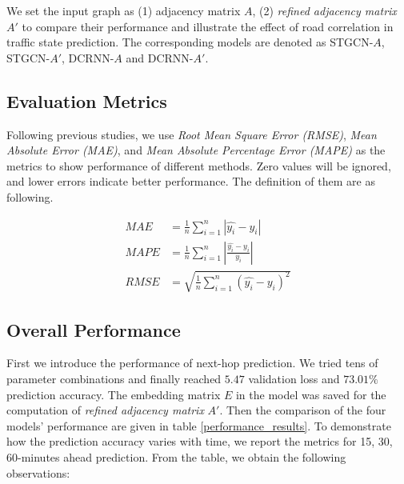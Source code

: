 We set the input graph as (1) adjacency matrix $A$, (2) \textit{refined adjacency matrix} $A'$ to compare their performance and illustrate the effect of road correlation in traffic state prediction. The corresponding models are denoted as STGCN-$A$, STGCN-$A'$, DCRNN-$A$ and DCRNN-$A'$.

\subsection{Evaluation Metrics}
Following previous studies, we use \textit{Root Mean Square Error (RMSE)}, \textit{Mean Absolute Error (MAE)}, and \textit{Mean Absolute Percentage Error (MAPE)} as the metrics to show performance of different methods. Zero values will be ignored, and lower errors indicate better performance. The definition of them are as following.

\begin{equation}
    \begin{aligned}
        MAE&=\frac 1n\sum_{i=1}^n|\hat{y_i}-y_i|\\
        MAPE&=\frac 1n\sum_{i=1}^n|\frac{\hat{y_i}-y_i}{y_i}|\\
        RMSE&=\sqrt{\frac 1n\sum_{i=1}^n(\hat{y_i}-y_i)^2}
    \end{aligned}
\end{equation}

\subsection{Overall Performance}
First we introduce the performance of next-hop prediction. We tried tens of parameter combinations and finally reached $5.47$ validation loss and $73.01\%$ prediction accuracy. The embedding matrix $E$ in the model was saved for the computation of \textit{refined adjacency matrix} $A'$. Then the comparison of the four models' performance are given in table \ref{performance_results}. To demonstrate how the prediction accuracy varies with time, we report the metrics for 15, 30, 60-minutes ahead prediction. From the table, we obtain the following observations:

